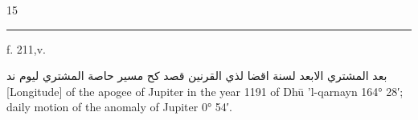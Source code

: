 \documentclass[11pt]{article}
\newcommand{\AbjadZero}{{\NallinoSigns\symbol{"E000}}}
\begin{document}
\vspace{-2mm}\noindent\hfill{\small 15}\hspace*{14mm}
\clearpage
\noindent{}
\par\vspace{-1mm}\noindent\rule{\textwidth}{.4pt}\par\vspace{1mm}
\begin{center}{\small f. 211,v.}\end{center}\vspace{-3mm}
\begin{center}\textarabic{بعد المشتري الابعد لسنة اقضا لذي القرنين قصد كح مسير حاصة المشتري ليوم \AbjadZero{} ند}\\[1mm]{\small [Longitude] of the apogee of Jupiter in the year 1191 of Dhū ’l-qarnayn 164° 28′; daily motion of the anomaly of Jupiter 0° 54′.}\end{center}\vspace{-2mm}
\end{document}
